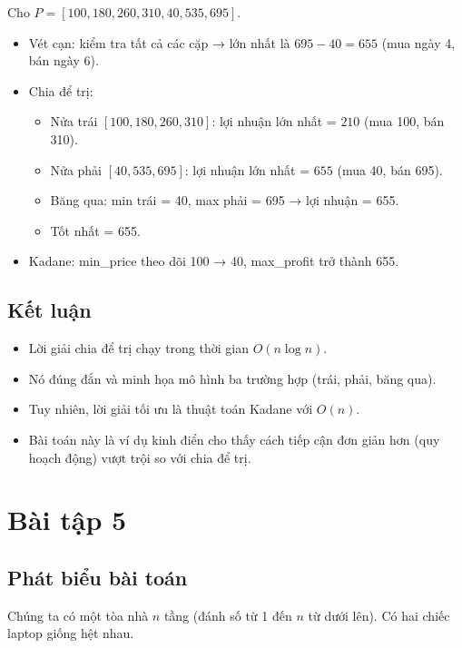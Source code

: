 \documentclass{article}
\begin{document}
Cho \(P = [100, 180, 260, 310, 40, 535, 695]\).

\begin{itemize}
    \item Vét cạn: kiểm tra tất cả các cặp → lớn nhất là \(695 - 40 = 655\) (mua ngày 4, bán ngày 6).
    \item Chia để trị:
    \begin{itemize}
        \item Nửa trái \([100,180,260,310]\): lợi nhuận lớn nhất = \(210\) (mua 100, bán 310).
        \item Nửa phải \([40,535,695]\): lợi nhuận lớn nhất = \(655\) (mua 40, bán 695).
        \item Băng qua: min trái = 40, max phải = 695 → lợi nhuận = 655.
        \item Tốt nhất = 655.
    \end{itemize}
    \item Kadane: min\_price theo dõi 100 → 40, max\_profit trở thành 655.
\end{itemize}

\subsection{Kết luận}

\begin{itemize}
    \item Lời giải chia để trị chạy trong thời gian \(O(n \log n)\).
    \item Nó đúng đắn và minh họa mô hình ba trường hợp (trái, phải, băng qua).
    \item Tuy nhiên, lời giải tối ưu là thuật toán Kadane với \(O(n)\).
    \item Bài toán này là ví dụ kinh điển cho thấy cách tiếp cận đơn giản hơn (quy hoạch động) vượt trội so với chia để trị.
\end{itemize}

\section{Bài tập 5}

\subsection{Phát biểu bài toán}

Chúng ta có một tòa nhà \(n\) tầng (đánh số từ 1 đến \(n\) từ dưới lên). Có hai chiếc laptop giống hệt nhau.  
\end{document}
